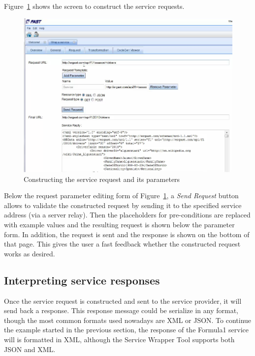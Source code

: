 \documentclass{fast_latex}
\begin{document}
Figure~\ref{fig:construct_service_request} shows the screen to construct the service requests.

\begin{figure}
  \begin{center}
    \includegraphics[width=\linewidth]{images/ServiceWrapperToolGVSRequestTemplate.png}
    \caption{Constructing the service request and its parameters}
    \label{fig:construct_service_request}
  \end{center}
\end{figure}


Below the request parameter editing form of Figure~\ref{fig:construct_service_request}, a \textit{Send Request} button allows to validate the constructed request by sending it to the specified service address (via a server relay). Then the placeholders for pre-conditions are replaced with example values and the resulting request is shown below the parameter form. In addition, the request is sent and the response is shown on the bottom of that page. This gives the user a fast feedback whether the constructed request works as desired. 


\subsection{Interpreting service responses} %
\label{sub:interpreting_service_responses}

Once the service request is constructed and sent to the service provider, it will send back a response. This response message could be serialize in any format, though the most common formats used nowadays are XML or JSON. To continue the example started in the previous section, the response of the Formula1 service will is formatted in XML, although the Service Wrapper Tool supports both JSON and XML.
\end{document}
